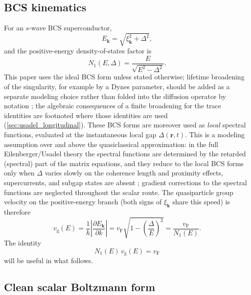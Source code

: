 \documentclass[
  aps,
  prb,
  preprint,
  superscriptaddress,
  longbibliography,
  nofootinbib
]{revtex4-2}
\newcommand{\br}{\mathbf{r}}
\newcommand{\bk}{\mathbf{k}}
\newcommand{\vF}{v_{\mathrm{F}}}
\newcommand{\vg}{v_{\mathrm{g}}}
\newcommand{\DOS}{N_1}
\begin{document}
\subsection{BCS kinematics}

For an \(s\)-wave BCS superconductor,
\begin{equation}
  E_\bk = \sqrt{\xi_\bk^2+\Delta^2},
  \label{eq:bcs_dispersion}
\end{equation}
and the positive-energy density-of-states factor is
\begin{equation}
  \DOS(E,\Delta)
  =
  \frac{E}{\sqrt{E^2-\Delta^2}}.
  \label{eq:bcs_dos}
\end{equation}
This paper uses the ideal BCS form unless stated otherwise; lifetime
broadening of the singularity, for example by a Dynes parameter, should be
added as a separate modeling choice rather than folded into the diffusion
operator by notation \cite{dynes1978}; the algebraic consequences of a
finite broadening for the trace identities are footnoted where those
identities are used (\cref{sec:usadel_longitudinal}).
These BCS forms are moreover used as \emph{local} spectral functions, evaluated
at the instantaneous local gap \(\Delta(\br,t)\). This is a modeling
assumption over and above the quasiclassical approximation: in the
full Eilenberger/Usadel theory the spectral functions are determined
by the retarded (spectral) part of the matrix equations, and they
reduce to the local BCS forms only when \(\Delta\) varies slowly on
the coherence length and proximity effects, supercurrents, and subgap
states are absent \cite{belzig1999,kopnin2001}; gradient corrections
to the spectral functions are neglected throughout the scalar route.
The quasiparticle group velocity on the positive-energy branch (both
signs of \(\xi_\bk\) share this speed) is therefore
\begin{equation}
  \vg(E)
  =
  \frac{1}{\hbar}\left|\frac{\partial E_\bk}{\partial k}\right|
  =
  \vF \sqrt{1-\left(\frac{\Delta}{E}\right)^2}
  =
  \frac{\vF}{\DOS(E)}.
  \label{eq:bcs_group_velocity}
\end{equation}
The identity
\begin{equation}
  \DOS(E)\,\vg(E)=\vF
  \label{eq:rho_vg_identity}
\end{equation}
will be useful in what follows.
\subsection{Clean scalar Boltzmann form}
\end{document}
